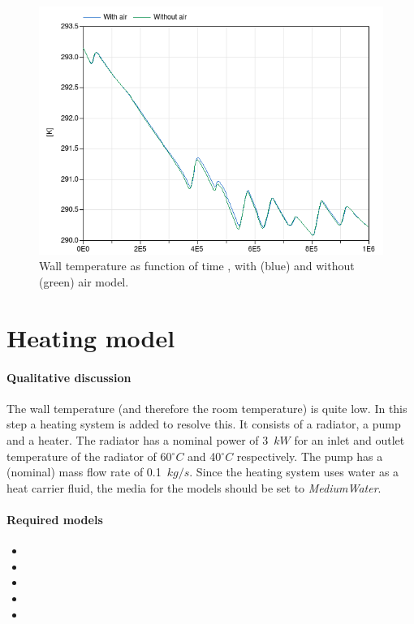 \documentclass[10pt,a4paper]{article}
\begin{document}
\begin{figure}[h!]
\centering
\includegraphics[scale=0.5]{result3.png}
\caption{Wall temperature as function of time ,
with (blue) and without (green) air model.}
\label{fig:res3}
\end{figure}

\newpage

\section{Heating model}
\paragraph{Qualitative discussion}
The wall temperature (and therefore the room temperature) is quite low. 
In this step a heating system is added to resolve this.
It consists of a radiator, a pump and a heater.
The radiator has a nominal power of 3~$kW$ for an inlet and outlet temperature of the radiator of 60$^{\circ}C$ and 40$^{\circ}C$ respectively.
The pump has a (nominal) mass flow rate of 0.1~$kg/s$.
Since the heating system uses water as a heat carrier fluid, 
the media for the models should be set to \textit{MediumWater}.

\paragraph{Required models}
\begin{itemize}
\item {}
\item {}
\item {}
\item {}
\item {}
\end{itemize}
\end{document}
